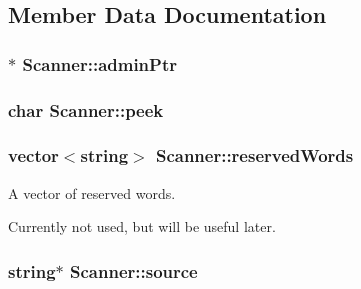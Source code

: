 \subsection{Member Data Documentation}
\hypertarget{classScanner_a05dbf851548561062953e9b1f235a349}{
\subsubsection[{adminPtr}]{$\ast$ {\bf Scanner::adminPtr}}}
\label{classScanner_a05dbf851548561062953e9b1f235a349}
\hypertarget{classScanner_a43b06598feabe08732abf86997cafa68}{
\subsubsection[{peek}]{\setlength{\rightskip}{0pt plus 5cm}char {\bf Scanner::peek}}}
\label{classScanner_a43b06598feabe08732abf86997cafa68}
\hypertarget{classScanner_afebea0f2ae1f1d0df1036a3a9c1a42df}{
\subsubsection[{reservedWords}]{\setlength{\rightskip}{0pt plus 5cm}vector$<$string$>$ {\bf Scanner::reservedWords}}}
\label{classScanner_afebea0f2ae1f1d0df1036a3a9c1a42df}


A vector of reserved words. 

Currently not used, but will be useful later. \hypertarget{classScanner_ab440d28734316634c3e957771468e7db}{
\subsubsection[{source}]{\setlength{\rightskip}{0pt plus 5cm}string$\ast$ {\bf Scanner::source}}}
\label{classScanner_ab440d28734316634c3e957771468e7db}


